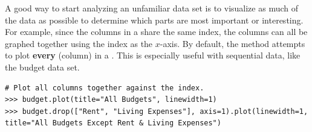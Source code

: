 A good way to start analyzing an unfamiliar data set is to visualize as much of the data as possible to determine which parts are most important or interesting.
For example, since the columns in a  share the same index, the columns can all be graphed together using the index as the $x$-axis.
By default, the  method attempts to plot \textbf{every}  (column) in a .
This is especially useful with sequential data, like the budget data set.

\begin{lstlisting}
# Plot all columns together against the index.
>>> budget.plot(title="All Budgets", linewidth=1)
>>> budget.drop(["Rent", "Living Expenses"], axis=1).plot(linewidth=1, title="All Budgets Except Rent & Living Expenses")
\end{lstlisting}

